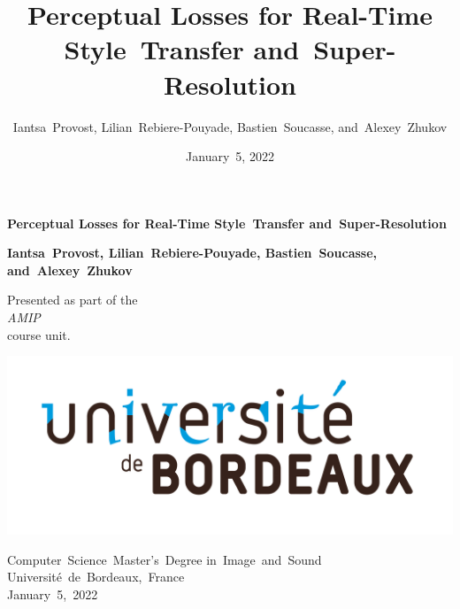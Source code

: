 \documentclass{article}
\title{Perceptual Losses for Real-Time Style~Transfer and~Super-Resolution}
\author{Iantsa~Provost, Lilian~Rebiere-Pouyade, Bastien~Soucasse, and~Alexey~Zhukov}
\date{January~5, 2022}
\begin{document}
{
    \begin{titlepage}
        \begin{center}
            \vspace*{1.5cm}

            \Large

            \textbf{Perceptual Losses for Real-Time Style~Transfer and~Super-Resolution}

            \vspace{.5cm}

            \vspace{1.5cm}

            \large

            \textbf{Iantsa~Provost, Lilian~Rebiere-Pouyade, Bastien~Soucasse, and~Alexey~Zhukov}

            \vfill

            \normalsize

            Presented as part of the\\
            \textit{AMIP}\\
            course unit.

            \vspace{1.5cm}

            \includegraphics[width=.5\textwidth]{images/college-logo.jpg}

            Computer~Science~Master's~Degree in~Image~and~Sound\\
            Université~de~Bordeaux,~France\\
            January~5,~2022
        \end{center}
    \end{titlepage}
    \newpage
    \setcounter{page}{2}
}

{
    \hypersetup{linkcolor=black}
    \tableofcontents
    \newpage
}
\end{document}
